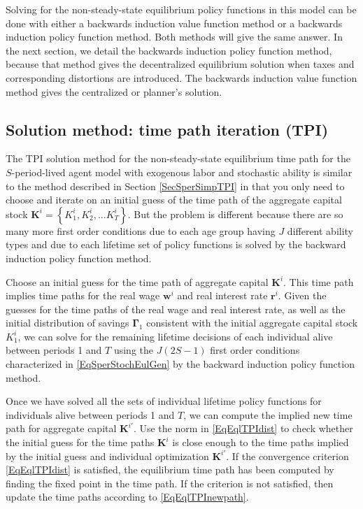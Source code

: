 \documentclass[letterpaper,12pt]{article}
\theoremstyle{definition}
\numberwithin{equation}{section}
\numberwithin{exercise}{section}
\begin{document}
      \begin{spacing}{1.5}

      Solving for the non-steady-state equilibrium policy functions in this model can be done with either a backwards induction value function method or a backwards induction policy function method. Both methods will give the same answer. In the next section, we detail the backwards induction policy function method, because that method gives the decentralized equilibrium solution when taxes and corresponding distortions are introduced. The backwards induction value function method gives the centralized or planner's solution.


   \subsection{Solution method: time path iteration (TPI)}\label{SecSperStochTPI}

      The TPI solution method for the non-steady-state equilibrium time path for the $S$-period-lived agent model with exogenous labor and stochastic ability is similar to the method described in Section \ref{SecSperSimpTPI} in that you only need to choose and iterate on an initial guess of the time path of the aggregate capital stock $\bm{K}^i = \left\{K_1^i,K_2^i,...K_T^i\right\}$. But the problem is different because there are so many more first order conditions due to each age group having $J$ different ability types and due to each lifetime set of policy functions is solved by the backward induction policy function method.

      Choose an initial guess for the time path of aggregate capital $\bm{K}^i$. This time path implies time paths for the real wage $\bm{w}^i$ and real interest rate $\bm{r}^i$. Given the guesses for the time paths of the real wage and real interest rate, as well as the initial distribution of savings $\bm{\Gamma}_1$ consistent with the initial aggregate capital stock $K_1^i$, we can solve for the remaining lifetime decisions of each individual alive between periods 1 and $T$ using the $J(2S-1)$ first order conditions characterized in \eqref{EqSperStochEulGen} by the backward induction policy function method.

      Once we have solved all the sets of individual lifetime policy functions for individuals alive between periods 1 and $T$, we can compute the implied new time path for aggregate capital $\bm{K}^{i'}$. Use the norm in \eqref{EqEqlTPIdist} to check whether the initial guess for the time paths $\bm{K}^{i}$ is close enough to the time paths implied by the initial guess and individual optimization $\bm{K}^{i'}$. If the convergence criterion \eqref{EqEqlTPIdist} is satisfied, the equilibrium time path has been computed by finding the fixed point in the time path. If the criterion is not satisfied, then update the time paths according to \eqref{EqEqlTPInewpath}.


\end{spacing}
\end{document}
